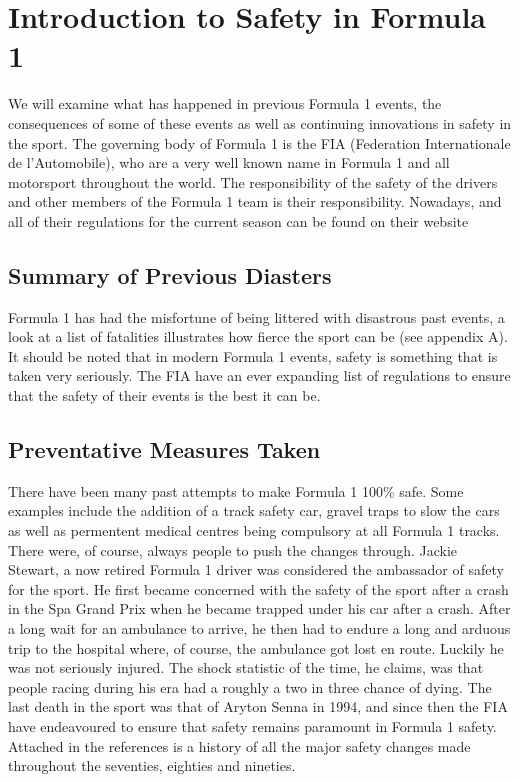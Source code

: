\documentclass[12pt]{article} %
\begin{document}
\section{Introduction to Safety in Formula 1} %

We will examine what has happened in previous Formula 1 events, the consequences of some of these events as well as
continuing innovations in safety in the sport. The governing body of Formula 1 is the FIA (Federation Internationale de l'Automobile), who are a very well known name in Formula 1 and all motorsport throughout the world. The responsibility of the safety of the drivers and other members of the Formula 1 team is their responsibility. Nowadays, and all of their regulations for the current season can be found on their website\\


\subsection{Summary of Previous Diasters} %

Formula 1 has had the misfortune of being littered with disastrous past events, a look at a list of fatalities illustrates how fierce the sport can be (see appendix A). It should be noted that in modern Formula 1 events, safety is something that is taken very seriously. The FIA have an ever expanding list of regulations to ensure that the safety of their events is the best it can be.


\subsection{Preventative Measures Taken} %
There have been many past attempts to make Formula 1 100\% safe. Some examples include the addition of a track safety car, gravel traps to slow the cars as well as permentent medical centres being compulsory at all Formula 1 tracks. There were, of course, always people to push the changes through. Jackie Stewart, a now retired Formula 1 driver was considered the ambassador of safety for the sport. He first became concerned with the safety of the sport after a crash in the Spa Grand Prix when he became trapped under his car after a crash. After a long wait for an ambulance to arrive, he then had to endure a long and arduous trip to the hospital where, of course, the ambulance got lost en route. Luckily he was not seriously injured. The shock statistic of the time, he claims, was that people racing during his era had a roughly a two in three chance of dying. The last death in the sport was that of Aryton Senna in 1994, and since then the FIA have endeavoured to ensure that safety remains paramount in Formula 1 safety. Attached in the references is a history of all the major safety changes made throughout the seventies, eighties and nineties.
\end{document}
